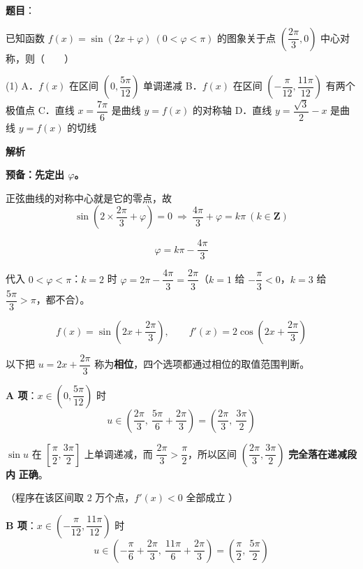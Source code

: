 \begin{answer}

\textbf{题目}：

已知函数 $f(x)=\sin(2x+\varphi)\ (0<\varphi<\pi)$ 的图象关于点 $\left(\dfrac{2\pi}3,0\right)$ 中心对称，则\mbox{（　　）}

\begin{gkopts}(1)
\task A．$f(x)$ 在区间 $\left(0,\dfrac{5\pi}{12}\right)$ 单调递减
\task B．$f(x)$ 在区间 $\left(-\dfrac\pi{12},\dfrac{11\pi}{12}\right)$ 有两个极值点
\task C．直线 $x=\dfrac{7\pi}6$ 是曲线 $y=f(x)$ 的对称轴
\task D．直线 $y=\dfrac{\sqrt3}2-x$ 是曲线 $y=f(x)$ 的切线
\end{gkopts}

\textbf{解析}

\textbf{预备：先定出 $\varphi$。}

正弦曲线的对称中心就是它的零点，故
\nopagebreak[4]
\[\sin\left(2\times\frac{2\pi}3+\varphi\right)=0\ \Longrightarrow\ \frac{4\pi}3+\varphi=k\pi\ (k\in\mathbf Z)\]

\nopagebreak[4]
\[\varphi=k\pi-\frac{4\pi}3\]

代入 $0<\varphi<\pi$：$k=2$ 时 $\varphi=2\pi-\dfrac{4\pi}3=\dfrac{2\pi}3$（$k=1$ 给 $-\dfrac\pi3<0$，$k=3$ 给 $\dfrac{5\pi}3>\pi$，都不合）。

\nopagebreak[4]
\[\boxed{f(x)=\sin\left(2x+\frac{2\pi}3\right)},\qquad f'(x)=2\cos\left(2x+\frac{2\pi}3\right)\]

以下把 $u=2x+\dfrac{2\pi}3$ 称为\textbf{相位}，四个选项都通过相位的取值范围判断。

\par\medskip

\textbf{A 项}：$x\in\left(0,\dfrac{5\pi}{12}\right)$ 时
\nopagebreak[4]
\[u\in\left(\frac{2\pi}3,\ \frac{5\pi}6+\frac{2\pi}3\right)=\left(\frac{2\pi}3,\ \frac{3\pi}2\right)\]

$\sin u$ 在 $\left[\dfrac\pi2,\dfrac{3\pi}2\right]$ 上单调递减，而 $\dfrac{2\pi}3>\dfrac\pi2$，所以区间 $\left(\dfrac{2\pi}3,\dfrac{3\pi}2\right)$ \textbf{完全落在递减段内}  \textbf{正确}。

（程序在该区间取 $2$ 万个点，$f'(x)<0$ 全部成立 ）

\par\medskip

\textbf{B 项}：$x\in\left(-\dfrac\pi{12},\dfrac{11\pi}{12}\right)$ 时
\nopagebreak[4]
\[u\in\left(-\frac\pi6+\frac{2\pi}3,\ \frac{11\pi}6+\frac{2\pi}3\right)=\left(\frac\pi2,\ \frac{5\pi}2\right)\]


\end{answer}
